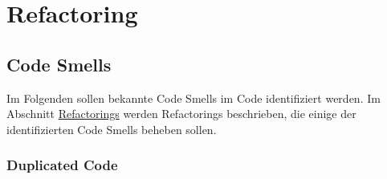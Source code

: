 \chapter{Refactoring}

\section{Code Smells} 

Im Folgenden sollen bekannte Code Smells im Code identifiziert werden.
Im Abschnitt \hyperref[sec:Refactorings]{Refactorings} werden Refactorings beschrieben, die einige der identifizierten Code Smells beheben sollen.


\subsection{Duplicated Code}
\label{sec:Duplicated_Code}

